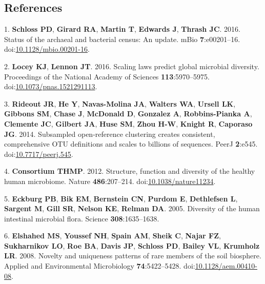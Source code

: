 \documentclass[11pt,]{article}
\begin{document}
\subsection*{References}\label{references}

\hypertarget{refs}{}
\hypertarget{ref-Schloss2016b}{}
1. \textbf{Schloss PD}, \textbf{Girard RA}, \textbf{Martin T},
\textbf{Edwards J}, \textbf{Thrash JC}. 2016. Status of the archaeal and
bacterial census: An update. mBio \textbf{7}:e00201--16.
doi:\href{https://doi.org/10.1128/mbio.00201-16}{10.1128/mbio.00201-16}.

\hypertarget{ref-Locey2016}{}
2. \textbf{Locey KJ}, \textbf{Lennon JT}. 2016. Scaling laws predict
global microbial diversity. Proceedings of the National Academy of
Sciences \textbf{113}:5970--5975.
doi:\href{https://doi.org/10.1073/pnas.1521291113}{10.1073/pnas.1521291113}.

\hypertarget{ref-Rideout2014}{}
3. \textbf{Rideout JR}, \textbf{He Y}, \textbf{Navas-Molina JA},
\textbf{Walters WA}, \textbf{Ursell LK}, \textbf{Gibbons SM},
\textbf{Chase J}, \textbf{McDonald D}, \textbf{Gonzalez A},
\textbf{Robbins-Pianka A}, \textbf{Clemente JC}, \textbf{Gilbert JA},
\textbf{Huse SM}, \textbf{Zhou H-W}, \textbf{Knight R}, \textbf{Caporaso
JG}. 2014. Subsampled open-reference clustering creates consistent,
comprehensive OTU definitions and scales to billions of sequences. PeerJ
\textbf{2}:e545.
doi:\href{https://doi.org/10.7717/peerj.545}{10.7717/peerj.545}.

\hypertarget{ref-Huttenhower2012}{}
4. \textbf{Consortium THMP}. 2012. Structure, function and diversity of
the healthy human microbiome. Nature \textbf{486}:207--214.
doi:\href{https://doi.org/10.1038/nature11234}{10.1038/nature11234}.

\hypertarget{ref-Eckburg2005}{}
5. \textbf{Eckburg PB}, \textbf{Bik EM}, \textbf{Bernstein CN},
\textbf{Purdom E}, \textbf{Dethlefsen L}, \textbf{Sargent M},
\textbf{Gill SR}, \textbf{Nelson KE}, \textbf{Relman DA}. 2005.
Diversity of the human intestinal microbial flora. Science
\textbf{308}:1635--1638.

\hypertarget{ref-Elshahed2008}{}
6. \textbf{Elshahed MS}, \textbf{Youssef NH}, \textbf{Spain AM},
\textbf{Sheik C}, \textbf{Najar FZ}, \textbf{Sukharnikov LO},
\textbf{Roe BA}, \textbf{Davis JP}, \textbf{Schloss PD}, \textbf{Bailey
VL}, \textbf{Krumholz LR}. 2008. Novelty and uniqueness patterns of rare
members of the soil biosphere. Applied and Environmental Microbiology
\textbf{74}:5422--5428.
doi:\href{https://doi.org/10.1128/aem.00410-08}{10.1128/aem.00410-08}.
\end{document}
